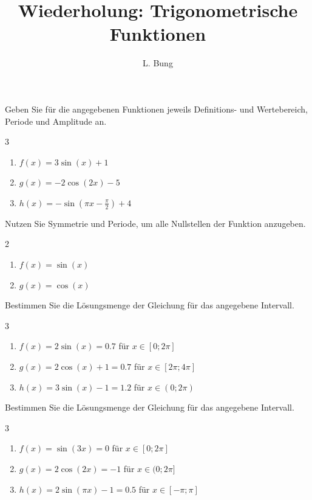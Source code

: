\documentclass[11pt, a4paper, oneside]{article}
\begin{document}
	\author{L. Bung}
	\title{Wiederholung: \hspace{10cm} Trigonometrische Funktionen}
	\subject{Mathematik}
	\maketitle
	
	
	Geben Sie für die angegebenen Funktionen jeweils Definitions- und Wertebereich, Periode und Amplitude an.
	
	\begin{multicols}{3}
		\begin{enumerate}[label=\alph*)]
			\item $f(x) = 3\sin(x)+1$
			\item $g(x) = -2\cos(2x)-5$
			\item $h(x) = -\sin(\pi x-\frac{\pi}{2})+4$
		\end{enumerate}
	\end{multicols}
	
	
	
	Nutzen Sie Symmetrie und Periode, um alle Nullstellen der Funktion anzugeben.
	
	\begin{multicols}{2}
		\begin{enumerate}[label=\alph*)]
			\item $f(x) = \sin(x)$
			\item $g(x) = \cos(x)$
		\end{enumerate}
	\end{multicols}
	
	
	
	Bestimmen Sie die Lösungsmenge der Gleichung für das angegebene Intervall.
	
	\begin{multicols}{3}
		\begin{enumerate}[label=\alph*)]
			\item $f(x) = 2\sin(x) = 0.7$ für $x \in [0; 2\pi]$
			\item $g(x) = 2\cos(x)+1 = 0.7$ für $x \in [2\pi;4\pi]$
			\item $h(x) = 3\sin(x)-1 = 1.2$ für $x \in (0; 2\pi)$
		\end{enumerate}
	\end{multicols}
	
	
	
	Bestimmen Sie die Lösungsmenge der Gleichung für das angegebene Intervall.
	
	\begin{multicols}{3}
		\begin{enumerate}[label=\alph*)]
			\item $f(x) = \sin(3x) = 0$ für $x \in [0; 2\pi]$
			\item $g(x) = 2\cos(2x) = -1$ für $x \in (0; 2\pi]$
			\item $h(x) = 2\sin(\pi x) -1 = 0.5$ für $x \in [-\pi; \pi]$
		\end{enumerate}
	\end{multicols}
\end{document}

